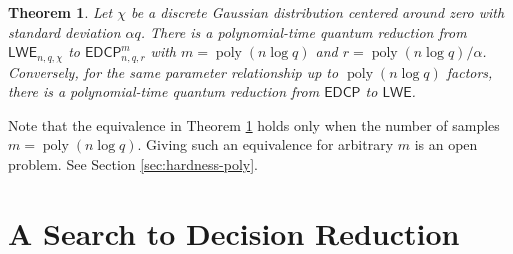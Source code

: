 \documentclass[11pt]{article}
\theoremstyle{plain}
\newtheorem{theorem}{Theorem}
\theoremstyle{definition}
\DeclareMathOperator{\poly}{poly}
\def\lwe{\mathsf{LWE}}
\def\edcp{\mathsf{EDCP}}
\begin{document}
\begin{theorem}
    \label{thm:lwe-edcp}
    Let $\chi$ be a discrete Gaussian distribution centered around zero with standard deviation $\alpha q$. There is a polynomial-time quantum reduction from $\lwe_{n, q, \chi}$ to $\edcp_{n, q, r}^m$ with $m = \poly(n\log q)$ and $r = \poly(n\log q) / \alpha$. Conversely, for the same parameter relationship up to $\poly(n\log q)$ factors, there is a polynomial-time quantum reduction from $\edcp$ to $\lwe$. 
\end{theorem}
Note that the equivalence in Theorem \ref{thm:lwe-edcp} holds only when the number of samples $m = \poly(n\log q)$. Giving such an equivalence for arbitrary $m$ is an open problem. See Section \ref{sec:hardness-poly}.





\section{A Search to Decision Reduction}
\end{document}
